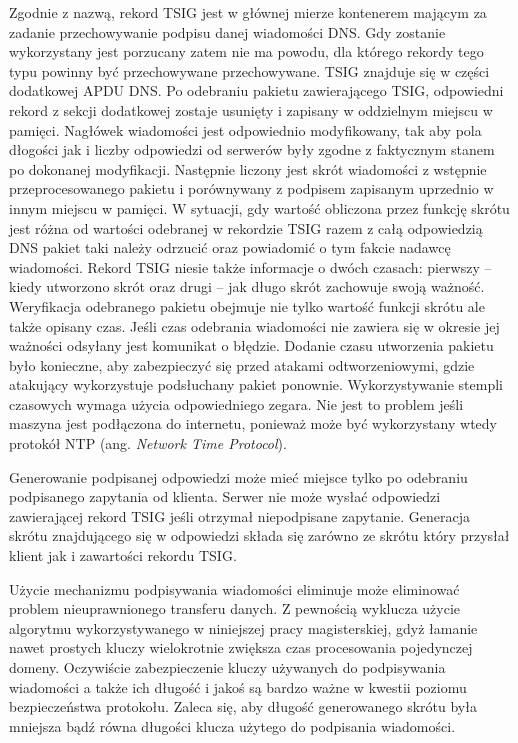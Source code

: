 Zgodnie z nazwą, rekord TSIG jest w głównej mierze kontenerem mającym za zadanie przechowywanie podpisu danej wiadomości DNS. Gdy zostanie wykorzystany jest porzucany zatem nie ma powodu, dla którego rekordy tego typu powinny być przechowywane przechowywane. TSIG znajduje się w części dodatkowej APDU DNS. Po odebraniu pakietu zawierającego TSIG, odpowiedni rekord z sekcji dodatkowej zostaje usunięty i zapisany w oddzielnym miejscu w pamięci. Nagłówek wiadomości jest odpowiednio modyfikowany, tak aby pola dłogości jak i liczby odpowiedzi od serwerów były zgodne z faktycznym stanem po dokonanej modyfikacji. Następnie liczony jest skrót wiadomości z wstępnie przeprocesowanego pakietu i porównywany z podpisem zapisanym uprzednio w innym miejscu w pamięci. W sytuacji, gdy wartość obliczona przez funkcję skrótu jest różna od wartości odebranej w rekordzie TSIG razem z całą odpowiedzią DNS pakiet taki należy odrzucić oraz powiadomić o tym fakcie nadawcę wiadomości. Rekord TSIG niesie także informacje o dwóch czasach: pierwszy -- kiedy utworzono skrót oraz drugi -- jak długo skrót zachowuje swoją ważność. Weryfikacja odebranego pakietu obejmuje nie tylko wartość funkcji skrótu ale także opisany czas. Jeśli czas odebrania wiadomości nie zawiera się w okresie jej ważności odsyłany jest komunikat o błędzie. Dodanie czasu utworzenia pakietu było konieczne, aby zabezpieczyć się przed atakami odtworzeniowymi, gdzie atakujący wykorzystuje podsłuchany pakiet ponownie. Wykorzystywanie stempli czasowych wymaga użycia odpowiedniego zegara. Nie jest to problem jeśli maszyna jest podłączona do internetu, ponieważ może być wykorzystany wtedy protokół NTP (ang. \textit{Network Time Protocol})\cite{RFC5905}.

Generowanie podpisanej odpowiedzi może mieć miejsce tylko po odebraniu podpisanego zapytania od klienta. Serwer nie może wysłać odpowiedzi zawierającej rekord TSIG jeśli otrzymał niepodpisane zapytanie. Generacja skrótu znajdującego się w odpowiedzi składa się zarówno ze skrótu który przysłał klient jak i zawartości rekordu TSIG\cite{nask-tsig}.

Użycie mechanizmu podpisywania wiadomości eliminuje może eliminować problem nieuprawnionego transferu danych. Z pewnością wyklucza użycie algorytmu wykorzystywanego w niniejszej pracy magisterskiej, gdyż łamanie nawet prostych kluczy wielokrotnie zwiększa czas procesowania pojedynczej domeny\cite{nask-tsig}. Oczywiście zabezpieczenie kluczy używanych do podpisywania wiadomości a także ich długość i jakoś są bardzo ważne w kwestii poziomu bezpieczeństwa protokołu. Zaleca się, aby długość generowanego skrótu była mniejsza bądź równa długości klucza użytego do podpisania wiadomości.

